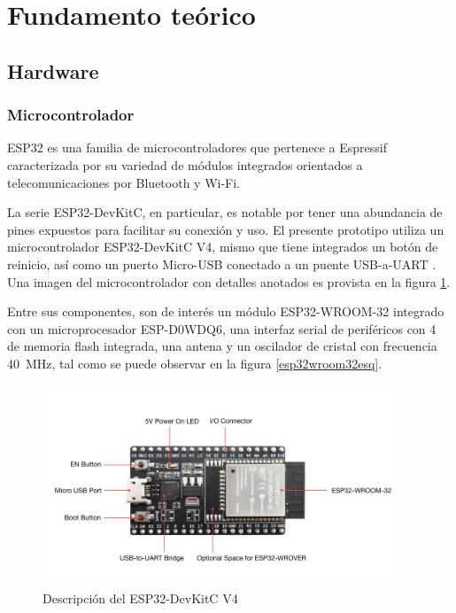 \documentclass[../main]{subfiles}
\begin{document}
\section{Fundamento teórico}

\subsection{Hardware}

\subsubsection{Microcontrolador}

ESP32 es una familia de microcontroladores que pertenece a Espressif
caracterizada por su variedad de módulos integrados orientados a
telecomunicaciones por Bluetooth y Wi-Fi. \supercite{ESP32_espressif}

La serie ESP32-DevKitC, en particular, es notable por tener una abundancia de
pines expuestos para facilitar su conexión y uso.
El presente prototipo utiliza un microcontrolador ESP32-DevKitC V4, mismo que
tiene integrados un botón de reinicio, así como un puerto Micro-USB
conectado a un puente USB-a-UART \supercite{devkitv4}.
Una imagen del microcontrolador con detalles anotados es provista en la figura
\ref{esp32devkitcv4image}.

Entre sus componentes, son de interés un módulo ESP32-WROOM-32 integrado con un
microprocesador ESP-D0WDQ6, una interfaz serial de periféricos con
\qty{4}{\mega\byte} de memoria flash integrada, una antena y un oscilador de
cristal con frecuencia \qty{40}{\MHz}, \supercite{esp32wroom32doc}
tal como se puede observar en la figura \ref{esp32wroom32esq}.

\begin{figure}[H]
	\centering
	\includegraphics[width=0.95\textwidth]{res/esp32-devkitc-v4-functional-overview.jpg}
	\caption{Descripción del ESP32-DevKitC V4 \supercite{devkitv4}}
	\label{esp32devkitcv4image}
\end{figure}
\end{document}
